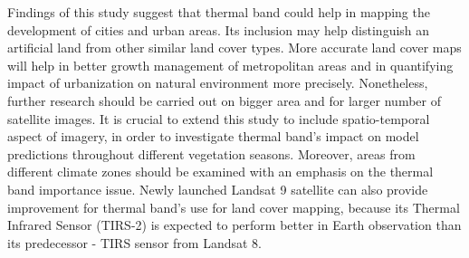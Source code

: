 \documentclass{amuthesis}
\begin{document}
Findings of this study suggest that thermal band could help in mapping
the development of cities and urban areas. Its inclusion may help
distinguish an artificial land from other similar land cover types. More
accurate land cover maps will help in better growth management of
metropolitan areas and in quantifying impact of urbanization on natural
environment more precisely. Nonetheless, further research should be
carried out on bigger area and for larger number of satellite images. It
is crucial to extend this study to include spatio-temporal aspect of
imagery, in order to investigate thermal band's impact on model
predictions throughout different vegetation seasons. Moreover, areas
from different climate zones should be examined with an emphasis on the
thermal band importance issue. Newly launched Landsat 9 satellite can
also provide improvement for thermal band's use for land cover mapping,
because its Thermal Infrared Sensor (TIRS-2) is expected to perform
better in Earth observation than its predecessor - TIRS sensor from
Landsat 8.

\printbibliography[heading=bibintoc, title=Bibliography]
\end{document}
